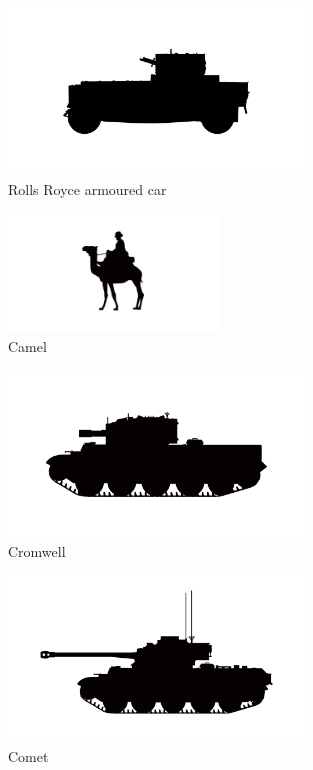 \begin{figure}[h]
  \centering
  \includegraphics[width=0.7\textwidth]{platforms/rolls-royce.pdf}
  \caption*{Rolls Royce armoured car}
\end{figure}

\begin{figure}[h]
  \centering
  \includegraphics[width=0.5\textwidth]{platforms/camel.pdf}
  \caption*{Camel}
\end{figure}

\begin{figure}[h]
  \centering
  \includegraphics[width=0.7\textwidth]{platforms/cromwell.pdf}
  \caption*{Cromwell}
\end{figure}

\begin{figure}[h]
  \centering
  \includegraphics[width=0.7\textwidth]{platforms/comet.pdf}
  \caption*{Comet}
\end{figure}

